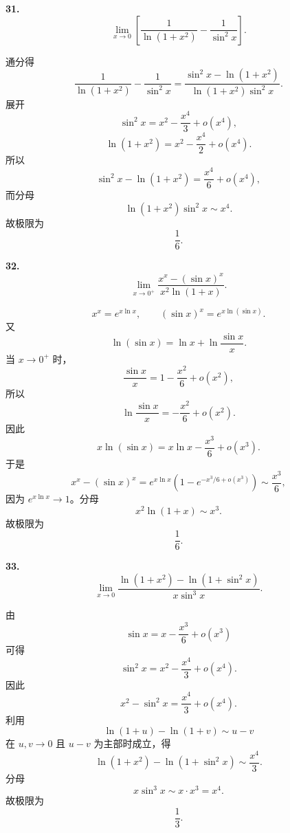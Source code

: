 \begin{problemblock}
\textbf{31.}
\[
\lim_{x\to0}
\left[
\frac1{\ln(1+x^2)}-\frac1{\sin^2x}
\right].
\]
\end{problemblock}

\begin{solutionblock}
通分得
\[
\frac1{\ln(1+x^2)}-\frac1{\sin^2x}
=\frac{\sin^2x-\ln(1+x^2)}
{\ln(1+x^2)\sin^2x}.
\]
展开
\[
\sin^2x=x^2-\frac{x^4}{3}+o(x^4),
\]
\[
\ln(1+x^2)=x^2-\frac{x^4}{2}+o(x^4).
\]
所以
\[
\sin^2x-\ln(1+x^2)
=\frac{x^4}{6}+o(x^4),
\]
而分母
\[
\ln(1+x^2)\sin^2x\sim x^4.
\]
故极限为
\[
\frac16.
\]
\end{solutionblock}

\begin{problemblock}
\textbf{32.}
\[
\lim_{x\to0^+}
\frac{x^x-(\sin x)^x}{x^2\ln(1+x)}.
\]
\end{problemblock}

\begin{solutionblock}
\[
x^x=e^{x\ln x},\qquad
(\sin x)^x=e^{x\ln(\sin x)}.
\]
又
\[
\ln(\sin x)=\ln x+\ln\frac{\sin x}{x}.
\]
当 \(x\to0^+\) 时，
\[
\frac{\sin x}{x}=1-\frac{x^2}{6}+o(x^2),
\]
所以
\[
\ln\frac{\sin x}{x}=-\frac{x^2}{6}+o(x^2).
\]
因此
\[
x\ln(\sin x)
=x\ln x-\frac{x^3}{6}+o(x^3).
\]
于是
\[
x^x-(\sin x)^x
=e^{x\ln x}\left(1-e^{-x^3/6+o(x^3)}\right)
\sim \frac{x^3}{6},
\]
因为 \(e^{x\ln x}\to1\)。分母
\[
x^2\ln(1+x)\sim x^3.
\]
故极限为
\[
\frac16.
\]
\end{solutionblock}

\begin{problemblock}
\textbf{33.}
\[
\lim_{x\to0}
\frac{\ln(1+x^2)-\ln(1+\sin^2x)}
{x\sin^3x}.
\]
\end{problemblock}

\begin{solutionblock}
由
\[
\sin x=x-\frac{x^3}{6}+o(x^3)
\]
可得
\[
\sin^2x=x^2-\frac{x^4}{3}+o(x^4).
\]
因此
\[
x^2-\sin^2x=\frac{x^4}{3}+o(x^4).
\]
利用
\[
\ln(1+u)-\ln(1+v)\sim u-v
\]
在 \(u,v\to0\) 且 \(u-v\) 为主部时成立，得
\[
\ln(1+x^2)-\ln(1+\sin^2x)
\sim\frac{x^4}{3}.
\]
分母
\[
x\sin^3x\sim x\cdot x^3=x^4.
\]
故极限为
\[
\frac13.
\]
\end{solutionblock}

